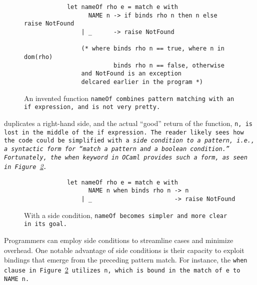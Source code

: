 \documentclass[manuscript,screen,review, 12pt]{acmart}
\begin{document}
    \begin{figure}[ht]
        \begin{verbatim}
            let nameOf rho e = match e with 
                  NAME n -> if binds rho n then n else raise NotFound
                | _      -> raise NotFound  

                (* where binds rho n == true, where n in dom(rho)
                         binds rho n == false, otherwise
                and NotFound is an exception 
                delcared earlier in the program *)
            \end{verbatim}    
        \caption{An invented function \tt{nameOf} combines pattern matching with
        an \tt{if} expression, and is not very pretty.}    
        \label{fig:ifnameof}
    \end{figure}
    
    
    duplicates a right-hand side, and the actual “good” return of the function,
    \tt{n}, is lost in the middle of the \tt{if} expression. The reader likely
    sees how the code could be simplified with a \it{side condition} to a
    pattern, i.e., a syntactic form for “match a pattern \it{and} a boolean
    condition.” Fortunately, the \tt{when} keyword in OCaml provides such a
    form, as seen in Figure~\ref{fig:whennameof}.
        
        \begin{figure}[ht]
            \begin{verbatim}
            let nameOf rho e = match e with     
                  NAME n when binds rho n -> n
                | _                       -> raise NotFound  
                \end{verbatim}
            \caption{With a side condition, \tt{nameOf} becomes simpler and more
            clear in its goal.}
            \label{fig:whennameof}
            \end{figure}

        
    
    
    

    Programmers can employ side conditions to streamline cases and minimize
    overhead. One notable advantage of side conditions is their capacity to
    exploit bindings that emerge from the preceding pattern match. For
    instance, the \tt{when} clause in Figure~\ref{fig:whennameof} utilizes \tt{n},
    which is bound in the match of \tt{e} to \tt{NAME n}.
\end{document}

